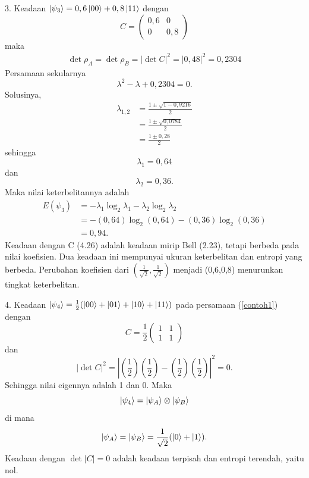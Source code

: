 3. Keadaan $\ket{\psi_3}=0,6\ket{00}+0,8\ket{11}$ dengan
\begin{equation}
	C=
	\begin{pmatrix}
		0,6&0\\
		0&0,8
	\end{pmatrix}
\end{equation}
maka
\begin{equation}
	\begin{aligned}
		\det \rho_A = \det \rho_B = |\det C|^2=|0,48|^2=0,2304
	\end{aligned}
\end{equation}
Persamaan sekularnya
\begin{equation}
	\lambda^2-\lambda+0,2304=0.
\end{equation}
Solusinya,
\begin{equation*}
	\begin{aligned}
		\lambda_{1,2}
		&=\frac{1\pm\sqrt{1-0,9216}}{2}\\
		&=\frac{1\pm\sqrt{0,0784}}{2}\\
		&=\frac{1\pm 0,28}{2}
	\end{aligned}
\end{equation*}
sehingga
\begin{equation}
	\lambda_1=0,64
\end{equation}
dan
\begin{equation}
	\lambda_2=0,36.
\end{equation}
Maka nilai keterbelitannya adalah
\begin{equation}
	\begin{aligned}
		E(\psi_3)
		&=-\lambda_1\log_2\lambda_1-\lambda_2\log_2\lambda_2\\
		&=-(0,64)\log_2(0,64)-(0,36)\log_2(0,36)\\
		&=0,94.
	\end{aligned}
\end{equation}
Keadaan dengan C (4.26) adalah keadaan mirip Bell (2.23), tetapi berbeda pada nilai koefisien. Dua keadaan ini mempunyai ukuran keterbelitan dan entropi yang berbeda. Perubahan koefisien dari $(\frac{1}{\sqrt{2}},\frac{1}{\sqrt{2}})$ menjadi (0,6,0,8) menurunkan tingkat keterbelitan.
	
4. Keadaan $\ket{\psi_4}=\frac{1}{2}(\ket{00}+\ket{01}+\ket{10}+\ket{11})$ pada persamaan (\ref{contoh1}) dengan
\begin{equation}
	C=\frac{1}{2}
	\begin{pmatrix}
		1&1\\
		1&1
	\end{pmatrix}
\end{equation}
dan
\begin{equation}
	|\det C|^2=|(\frac{1}{2})(\frac{1}{2})-(\frac{1}{2})(\frac{1}{2})|^2=0.
\end{equation}
Sehingga nilai eigennya adalah 1 dan 0. Maka
\begin{equation}
	\ket{\psi_4}=\ket{\psi_A}\otimes\ket{\psi_B}
\end{equation}
di mana
\begin{equation}
	\ket{\psi_A}=\ket{\psi_B}=\frac{1}{\sqrt{2}}(\ket{0}+\ket{1}).
\end{equation}
Keadaan dengan $\det|C|=0$ adalah keadaan terpisah dan entropi terendah, yaitu nol.
	
